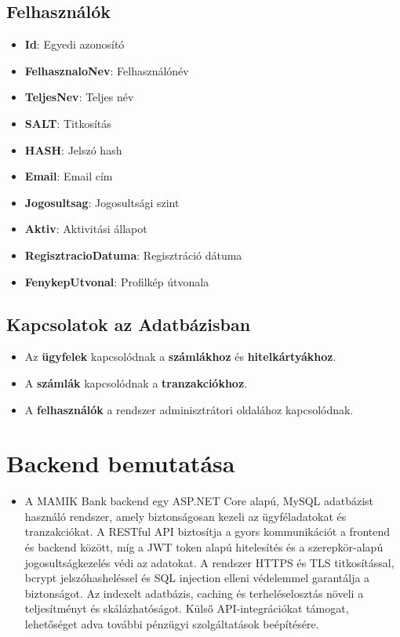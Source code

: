 \documentclass[colorlinks]{thesis-kando}
\theoremstyle{definition}
\theoremstyle{remark}
\begin{document}
\begin{itemize}
\subsection{Felhasználók}
\begin{itemize}
    \item \textbf{Id}: Egyedi azonosító
    \item \textbf{FelhasznaloNev}: Felhasználónév
    \item \textbf{TeljesNev}: Teljes név
    \item \textbf{SALT}: Titkosítás
    \item \textbf{HASH}: Jelszó hash
    \item \textbf{Email}: Email cím
    \item \textbf{Jogosultsag}: Jogosultsági szint
    \item \textbf{Aktiv}: Aktivitási állapot
    \item \textbf{RegisztracioDatuma}: Regisztráció dátuma
    \item \textbf{FenykepUtvonal}: Profilkép útvonala
\end{itemize}

\subsection{Kapcsolatok az Adatbázisban}
\begin{itemize}
    \item Az \textbf{ügyfelek} kapcsolódnak a \textbf{számlákhoz} és \textbf{hitelkártyákhoz}.
    \item A \textbf{számlák} kapcsolódnak a \textbf{tranzakciókhoz}.
    \item A \textbf{felhasználók} a rendszer adminisztrátori oldalához kapcsolódnak.
\end{itemize}
\newpage
\section{Backend bemutatása}
\begin{itemize}
    \item A MAMIK Bank backend egy ASP.NET Core alapú, MySQL adatbázist használó rendszer, amely biztonságosan kezeli az ügyféladatokat és tranzakciókat. A RESTful API biztosítja a gyors kommunikációt a frontend és backend között, míg a JWT token alapú hitelesítés és a szerepkör-alapú jogosultságkezelés védi az adatokat. A rendszer HTTPS és TLS titkosítással, bcrypt jelszóhasheléssel és SQL injection elleni védelemmel garantálja a biztonságot. Az indexelt adatbázis, caching és terheléselosztás növeli a teljesítményt és skálázhatóságot. Külső API-integrációkat támogat, lehetőséget adva további pénzügyi szolgáltatások beépítésére.
\end{itemize}

\end{itemize}
\end{document}
